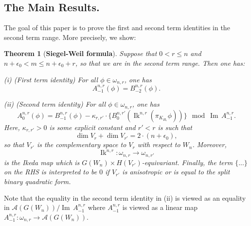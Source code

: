 \documentclass[10pt]{amsart}
\theoremstyle{plain}
\newtheorem{Thm}[equation]{Theorem}
\numberwithin{equation}{section}
\begin{document}
 
\vskip 5pt

 
 \subsection{\bf The Main Results.}
 The goal of this paper is to prove the first and second term
 identities in the second term range. More precisely, we  show:
 \vskip 5pt
 
 \begin{Thm}[{\bf Siegel-Weil formula}] \label{T:intro}
 Suppose that $ 0 < r \leq n$ and $n+ \epsilon_0 < m  \leq n +
 \epsilon_0 + r$, so that we are in the second term range. Then one
 has:
 \vskip 5pt
 
 \noindent (i) (First term identity) For all $\phi \in \omega_{n,r}$, one has
 \[  
A^{n,r}_{-1}(\phi) =   B^{n,r}_{-2}(\phi).  
\]
 \vskip 5pt
 
 \noindent (ii) (Second term identity) For all $\phi \in \omega_{n,r}$, one has
 \[   
A^{n,r}_0(\phi) 
  =    B^{n,r}_{-1}(\phi)    - \kappa_{r,r'} \cdot \{ 
    B^{n,r'}_0({\operatorname{Ik}}^{n,r}(\pi_{K_{H_r}}\phi))\} \mod {{\operatorname{Im\,}}
  A^{n,r}_{-1}}. 
\]
  Here, $\kappa_{r,r'}>0$ is some explicit constant and $r' < r$ is such that 
  \[  
\dim V_r + \dim V_{r'}  =  2 \cdot (n + \epsilon_0), 
\]
so that  $V_{r'}$ is  the complementary space to $V_r$ with respect to
$W_n$. Moreover,   
\[  
{\operatorname{Ik}}^{n,r} :  \omega_{n,r}  \longrightarrow\omega_{n, r'} 
\]
is the Ikeda map which is  $G(W_n) \times H(V_{r'})$-equivariant. Finally, the term $\{ ...\}$ on the RHS is interpreted to be $0$ if $V_{r'}$ is anisotropic or is equal to the split binary quadratic form.
 
\end{Thm}
 \vskip 5pt
 
 Note that the equality in the second term identity in (ii) is viewed as an equality in ${\mathcal{A}}(G(W_n))/{\operatorname{Im\,}} A^{n,r}_{-1}$ where $A^{n,r}_{-1}$ is viewed as a linear map
$A^{n,r}_{-1}:\omega_{n,r}\rightarrow{\mathcal{A}}(G(W_n))$.    
\vskip 10pt
 
\end{document}

